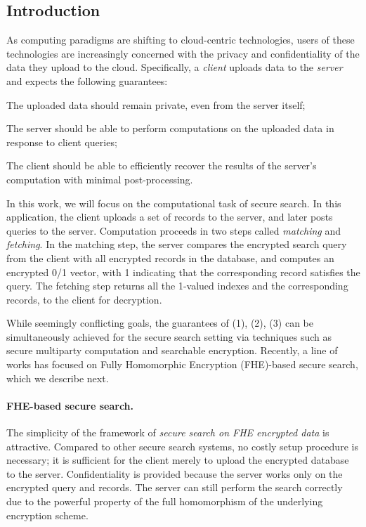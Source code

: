 \subsection{Introduction}
As computing paradigms are shifting to cloud-centric technologies, users
of these technologies are increasingly concerned with the privacy and
confidentiality of the data they upload to the cloud. Specifically, a
\emph{client} uploads data to the \emph{server} and expects the
following guarantees: 

\BEN
\item The uploaded data should remain private, even
from the server itself;
\item The server should be able to perform computations on the uploaded
data in response to client queries;
\item The client should be able to efficiently recover the results of
the server's computation with minimal post-processing.
\EEN

In this work, we will focus on the computational task of secure search.
In this application, the client uploads a set of records to the server,
and later posts queries to the server.  Computation proceeds in two
steps called \emph{matching} and \emph{fetching}.
%
In the matching step, the server compares the encrypted search query from
the client with all encrypted records in the database, and computes an
encrypted 0/1 vector, with 1 indicating that the corresponding record
satisfies the query.  The fetching step returns all the 1-valued
indexes and the corresponding records, to the client for decryption.

While seemingly conflicting goals, the guarantees of (1), (2), (3) can
be simultaneously achieved for the secure search setting via techniques
such as secure multiparty computation and searchable encryption.
Recently, a line of works has focused on Fully Homomorphic Encryption
(FHE)-based secure search, which we describe next.


\paragraph{FHE-based secure search.}
The simplicity of the framework of {\em secure search on FHE encrypted
data} is attractive. Compared to other secure search systems, no costly
setup procedure is necessary; it is sufficient for the client merely to
upload the encrypted database to the server. Confidentiality is provided
because the server works only on the encrypted query and records. The
server can still perform the search correctly due to the powerful
property of the full homomorphism of the underlying encryption scheme. 

